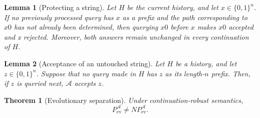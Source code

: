 \documentclass[10pt,a4paper]{amsart}
\newtheorem{lemma}{Lemma}
\newtheorem{theorem}{Theorem}
\begin{document}
\begin{lemma}[Protecting a string]
\label{lem:protect-string}
Let \(H\) be the current history, and let
\(x\in\{0,1\}^n\). If no previously processed query has \(x\) as a prefix and the path corresponding to \(x0\) has not already been determined, then querying \(x0\) before \(x\) makes \(x0\) accepted and x rejected. 
Moreover, both answers remain unchanged in every continuation of \(H\).
\end{lemma}

\begin{lemma}[Acceptance of an untouched string]
\label{lem:untouched-string}
Let \(H\) be a history, and let \(z\in\{0,1\}^n\). Suppose that no
query made in \(H\) has \(z\) as its length-\(n\) prefix. Then,
if \(z\) is queried next, \(\mathcal A\) accepts \(z\).
\end{lemma}

\begin{theorem}[Evolutionary separation]
\label{thm:evsep-appendix}
Under continuation-robust semantics,
\[
P_{\mathrm{ev}}^{\mathcal A}
\neq
NP_{\mathrm{ev}}^{\mathcal A}.
\]
\end{theorem}
\end{document}
